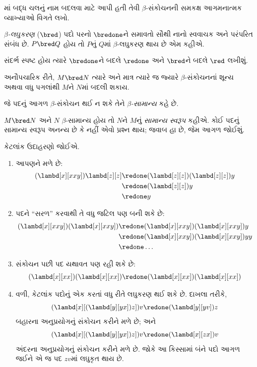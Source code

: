 \begin{prob} 
  માં બદ્ધ ચલનું નામ
  બદલવા માટે આપી હતી તેવી $\beta$-સંકોચનની સમકક્ષ
  આગમનાત્મક વ્યાખ્યાઓ વિગતે લખો.
\end{prob}
  
\begin{defn} 
  \emph{$\beta$-લઘુકરણ} ($\bred$) પદો પરનો
  $\bredone$ને સમાવતો સૌથી નાનો સ્વવાચક અને
  પરંપરિત સંબંધ છે. $P \bred Q$ હોય તો $P$નું
  $Q$માં $\beta$-લઘુકરણ થાય છે એમ કહીએ.
\end{defn}

સંદર્ભ સ્પષ્ટ હોય ત્યારે $\bredone$ને બદલે $\redone$
અને $\bred$ને બદલે $\red$ લખીશું.

અનૌપચારિક રીતે, $M \bred N$ ત્યારે અને માત્ર ત્યારે જ
જ્યારે $\beta$-સંકોચનનાં શૂન્ય અથવા વધુ પગલાંથી
$M$ને $N$માં બદલી શકાય.

\begin{defn}[$\beta$-સામાન્ય]
જે પદનું આગળ $\beta$-સંકોચન થઈ ન શકે તેને
\emph{$\beta$-સામાન્ય} કહે છે.
\end{defn}

$M \bred N$ અને $N$ $\beta$-સામાન્ય હોય તો $N$ને
$M$નું \emph{સામાન્ય સ્વરૂપ} કહીએ. કોઈ પદનું સામાન્ય
સ્વરૂપ અનન્ય છે કે નહીં એવો પ્રશ્ન થાય; જવાબ હા છે,
જેમ આગળ જોઈશું.

કેટલાંક ઉદાહરણો જોઈએ.
\begin{enumerate}
\item આપણને મળે છે:
\begin{align*}
(\lambd[x][xxy]) \lambd[z][z] & \redone (\lambd[z][z])(\lambd[z][z]) y \\
& \redone (\lambd[z][z]) y \\
& \redone y
\end{align*}
\item પદને ``સરળ'' કરવાથી તે વધુ જટિલ પણ બની શકે છે:
\begin{align*}
(\lambd[x][xxy])(\lambd[x][xxy]) & \redone (\lambd[x][xxy])(\lambd[x][xxy])y \\
& \redone (\lambd[x][xxy])(\lambd[x][xxy])yy \\
& \redone \dots
\end{align*}
\item સંકોચન પછી પદ યથાવત પણ રહી શકે છે:
\[
(\lambd[x][xx])(\lambd[x][xx]) \redone (\lambd[x][xx])(\lambd[x][xx])
\]
\item વળી, કેટલાંક પદોનું એક કરતાં વધુ રીતે લઘુકરણ
  થઈ શકે છે. દાખલા તરીકે,
\[
(\lambd[x][(\lambd[y][yx]) z]) v \redone (\lambd[y][yv]) z
\]
બહારના અનુપ્રયોગનું સંકોચન કરીને મળે છે; અને
\[
(\lambd[x][(\lambd[y][yx]) z]) v \redone (\lambd[x][zx]) v
\]
અંદરના અનુપ્રયોગનું સંકોચન કરીને મળે છે. જોકે આ
કિસ્સામાં બંને પદો આગળ જઈને એ જ પદ $zv$માં લઘુકૃત
થાય છે.
\end{enumerate}

